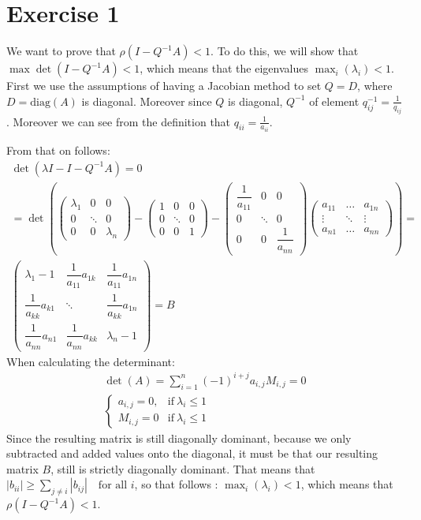 \section{Exercise 1}
We want to prove that $\rho ( I - Q^{-1} A ) < 1$. To do this, we will show that $\max \det( I - Q^{-1} A ) < 1$, which means that the eigenvalues $\max_{i} (\lambda_i) < 1 $. 
First we use the assumptions of having a Jacobian method to set $Q=D$, where $D = \text{diag} (A)$ is diagonal. Moreover since $Q$ is diagonal, $Q^{-1}$ of element $q^{-1}_{ij} = \frac{1}{q_{ij}}$. Moreover we can see from the definition that $q_{ii} = \frac{1}{a_{ii}}$.

From that on follows:
\begin{gather*}
\det(\lambda I - I - Q^{-1} A) = 0  \\
= \det \left(
\left( \begin{array}{ccc}
\lambda_1 & 0 & 0 \\
0 & \ddots & 0\\
0 & 0 & \lambda_n
\end{array} \right)
-
\left( \begin{array}{ccc}
1 & 0 & 0 \\
0 & \ddots & 0\\
0 & 0 & 1
\end{array} \right)
-
\left( \begin{array}{ccc}
\dfrac{1}{a_{11}} & 0 & 0 \\
0 & \ddots & 0\\
0 & 0 & \dfrac{1}{a_{nn}}
\end{array} \right)
\left( \begin{array}{ccc}
a_{11} & \hdots & a_{1n} \\
\vdots & \ddots & \vdots\\
a_{n1} & \hdots & a_{nn}
\end{array} \right)
\right) 
= \\
\left( \begin{array}{ccc}
\lambda_1 - 1 & \dfrac{1}{a_{11}}a_{1k} & \dfrac{1}{a_{11}} a_{1n} \\
\dfrac{1}{a_{kk}}a_{k1} & \ddots & \dfrac{1}{a_{kk}}a_{1n} \\
\dfrac{1}{a_{nn}}a_{n1} & \dfrac{1}{a_{nn}}a_{kk} & \lambda_n - 1
\end{array} \right) = B
\end{gather*}
When calculating the determinant:
\begin{gather*}
\det(A) = \sum_{i=1}^n (-1)^{i+j} a_{i,j} M_{i,j} = 0 \\
\begin{cases}
      a_{i,j} = 0 , & \text{if}\ \lambda_i \leq 1 \\
      M_{i,j} = 0 & \text{if}\ \lambda_i \leq 1
 \end{cases}
\end{gather*}
Since the resulting matrix is still diagonally dominant, because we only subtracted and added values onto the diagonal, it must be that our resulting matrix $B$, still is strictly diagonally dominant.
That means that $|b_{ii}| \geq \sum_{j\neq i} |b_{ij}| \quad\text{for all } i$, so that follows : $\max_i (\lambda_i) < 1$, which means that $\rho ( I - Q^{-1} A ) < 1$.

